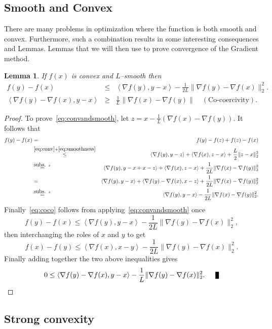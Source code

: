 \documentclass[11pt]{article}
\newcommand{\qed}{\nobreak \ifvmode \relax \else
      \ifdim\lastskip<1.5em \hskip-\lastskip
      \hskip1.5em plus0em minus0.5em \fi \nobreak
      \vrule height0.75em width0.5em depth0.25em\fi}
\newcommand{\norm}[1]{\lVert#1\rVert}
\newcommand{\dotprod}[1]{\left< #1\right>}
\newtheorem{lemma}{Lemma}[section]
\begin{document}
\subsection{Smooth and Convex}
There are many problems in optimization where the function is both smooth and convex. Furthermore, such a combination results in some interesting consequences and Lemmas. Lemmas that we will then use to prove convergence of the Gradient method.
\begin{lemma}\label{lem:convandsmooth}
If $f(x)$ is convex and $L$--smooth then
\begin{eqnarray}
f(y) - f(x) & \leq &\dotprod{\nabla f(y),y-x}- \frac{1}{2L}\norm{\nabla f(y)-\nabla f(x)}_2^2.\label{eq:convandsmooth}\\
\dotprod{\nabla f(y)-\nabla f(x),y-x} &\geq & \frac{1}{L} \norm{\nabla f(x) - \nabla f(y)} \quad (\mbox{Co-coercivity}).\label{eq:coco}
\end{eqnarray}
\end{lemma}
\begin{proof}
To prove~\eqref{eq:convandsmooth},
let $z = x - \frac{1}{L}(\nabla f(x) - \nabla f(y))$. It follows that
\begin{eqnarray*}
f(y) -f(x) & = & f(y) -f(z)+f(z) - f(x)\\ &\overset{\eqref{eq:conv}+\eqref{eq:smoothness} } \leq &   
\dotprod{\nabla f(y), y-z} + \dotprod{\nabla f(x), z-x} +\frac{L}{2}\norm{z-x}_2^2 \\
& \overset{\mbox{subs. }z}{=}&
\dotprod{\nabla f(y), y-x+x-z} + \dotprod{\nabla f(x), z-x}+\frac{1}{2L}\norm{\nabla f(x) - \nabla f(y)}_2^2\\
& =& \dotprod{\nabla f(y), y-x} + \dotprod{\nabla f(y)-\nabla f(x), x-z}+\frac{1}{2L}\norm{\nabla f(x) - \nabla f(y)}_2^2\\
& \overset{\mbox{subs. }z}{=}& \dotprod{\nabla f(y), y-x} -\frac{1}{2L}\norm{\nabla f(x) - \nabla f(y)}_2^2.
\end{eqnarray*}
Finally~\eqref{eq:coco} follows from applying~\eqref{eq:convandsmooth} once
\[f(y) - f(x)  \leq \dotprod{\nabla f(y),y-x}- \frac{1}{2L}\norm{\nabla f(y)-\nabla f(x)}_2^2,\]
then interchanging the roles of $x$ and $y$ to get
\[f(x) - f(y)  \leq \dotprod{\nabla f(x),x-y}- \frac{1}{2L}\norm{\nabla f(y)-\nabla f(x)}_2^2.\]
Finally adding together the two above inequalities gives
\[0 \leq \dotprod{\nabla f(y)-\nabla f(x),y-x}- \frac{1}{L}\norm{\nabla f(y)-\nabla f(x)}_2^2.\qed\]
\end{proof}
\subsection{Strong convexity}
\end{document}
